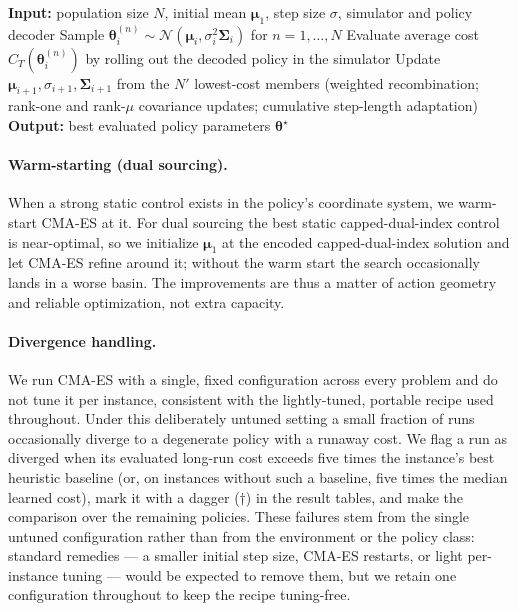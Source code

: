 \documentclass[11pt]{article}
\newcommand{\btheta}{\boldsymbol{\theta}}
\newcommand{\bmu}{\boldsymbol{\mu}}
\newcommand{\bSigma}{\boldsymbol{\Sigma}}
\begin{document}
\begin{algorithm}[!htbp]
\caption{CMA-ES policy optimization (used for all ten problems)}
\label{alg:cmaes-framework}
\begin{algorithmic}[1]
    \STATE \textbf{Input:} population size $N$, initial mean $\bmu_1$, step size $\sigma$, simulator and policy decoder
        \STATE Sample $\btheta^{(n)}_i\sim\mathcal{N}(\bmu_i,\sigma_i^2\bSigma_i)$ for $n=1,\dots,N$
        \STATE Evaluate average cost $\hat C_T(\btheta^{(n)}_i)$ by rolling out the decoded policy in the simulator
        \STATE Update $\bmu_{i+1},\sigma_{i+1},\bSigma_{i+1}$ from the $N'$ lowest-cost members (weighted recombination; rank-one and rank-$\mu$ covariance updates; cumulative step-length adaptation)
    \ENDFOR
    \STATE \textbf{Output:} best evaluated policy parameters $\btheta^\star$
\end{algorithmic}
\end{algorithm}

\paragraph{Warm-starting (dual sourcing).}
When a strong static control exists in the policy's coordinate system, we warm-start CMA-ES at it. For
dual sourcing the best static capped-dual-index control is near-optimal, so we initialize $\bmu_1$ at
the encoded capped-dual-index solution and let CMA-ES refine around it; without the warm start the
search occasionally lands in a worse basin. The improvements are thus a matter of action geometry and
reliable optimization, not extra capacity.

\paragraph{Divergence handling.}
We run CMA-ES with a single, fixed configuration across every problem and do not tune it per
instance, consistent with the lightly-tuned, portable recipe used throughout. Under this deliberately
untuned setting a small fraction of runs occasionally diverge to a degenerate policy with a runaway
cost. We flag a run as diverged when its evaluated long-run cost exceeds five times the instance's
best heuristic baseline (or, on instances without such a baseline, five times the median learned
cost), mark it with a dagger ($\dagger$) in the result tables, and make the comparison over the
remaining policies. These failures stem from the single untuned configuration rather than from the
environment or the policy class: standard remedies --- a smaller initial step size, CMA-ES restarts,
or light per-instance tuning --- would be expected to remove them, but we retain one configuration
throughout to keep the recipe tuning-free.
\end{document}

